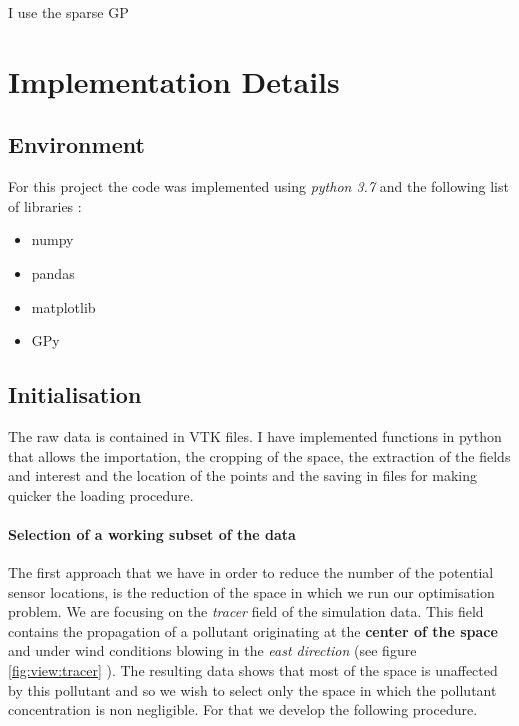 I use the sparse GP 

\section{Implementation Details}

\subsection{Environment}

For this project the code was implemented using \textit{python 3.7} and the following list of libraries : 

\begin{itemize}
	\item numpy
	\item pandas
	\item matplotlib
	\item GPy
\end{itemize}


\subsection{Initialisation}

The raw data is contained in VTK files. I have implemented functions in python that allows the importation, the cropping of the space, the extraction of the fields and interest and the location of the points and the saving in files for making quicker the loading procedure. 

\paragraph{Selection of a working subset of the data}
The first approach that we have in order to reduce the number of the potential sensor locations, is the reduction of the space in which  we run our optimisation problem. We are focusing on the \textit{tracer} field of the simulation data. This field contains the propagation of a pollutant originating at the \textbf{center of the space} and under wind conditions blowing in the \textit{east direction} (see figure \ref{fig:view:tracer} ). The resulting data shows that most of the space is unaffected by this pollutant and so we wish to select only the space in which the pollutant concentration is non negligible. For that we develop the following procedure. \\


